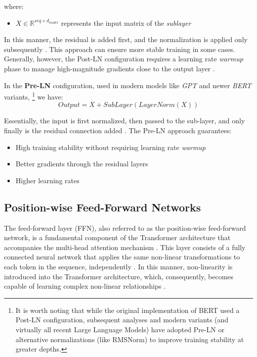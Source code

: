 where:
\begin{itemize}
\item $X \in \mathbb{R}^{seq \times d_{model}}$ represents the input matrix of the \textit{sublayer}
\end{itemize}
In this manner, the residual is added first, and the normalization is applied only subsequently \cite{arxiv-attention, git-hub}.
This approach can ensure more stable training in some cases. Generally, however, the Post-LN configuration requires a learning rate \textit{warmup} phase to manage high-magnitude gradients close to the output layer \cite{arxiv-attention, stanford}.

In the \textbf{Pre-LN} configuration, used in modern models like \textit{GPT} and newer \textit{BERT} variants, \footnote{It is worth noting that while the original implementation of BERT used a Post-LN configuration\cite{xiong2020ln}, subsequent analyses and modern variants (and virtually all recent Large Language Models) have adopted Pre-LN or alternative normalizations (like RMSNorm)\cite{liu2023b2t,xiong2020ln} to improve training stability at greater depths\cite{liu2023b2t}.} we have:
\begin{equation}
Output = X + SubLayer(LayerNorm(X))
\end{equation}

Essentially, the input is first normalized, then passed to the sub-layer, and only finally is the residual connection added \cite{git-hub}.
The Pre-LN approach guarantees:
\begin{itemize}
\item High training stability without requiring learning rate \textit{warmup} \cite{git-hub, stanford}
\item Better gradients through the residual layers \cite{arxiv-skipconnection-survey, attention-is-not}
\item Higher learning rates \cite{git-hub, stanford}
\end{itemize}


\subsection{Position-wise Feed-Forward Networks}
The feed-forward layer (FFN), also referred to as the position-wise feed-forward network, is a fundamental component of the Transformer architecture \cite{arxiv-attention, attention-is-not} that accompanies the multi-head attention mechanism \cite{arxiv-attention}. This layer consists of a fully connected neural network \cite{arxiv-attention, stanford} that applies the same non-linear transformations to each token in the sequence, independently \cite{arxiv-attention, stanford, GeeksForGeeks}. In this manner, non-linearity is introduced into the Transformer architecture, which, consequently, becomes capable of learning complex non-linear relationships \cite{stanford, attention-is-not}.

